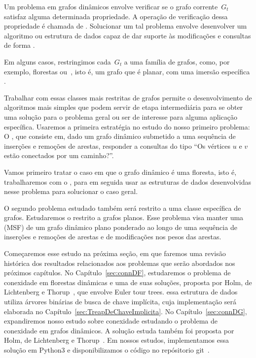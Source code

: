 Um problema em grafos dinâmicos envolve verificar se o grafo corrente~$G_t$ satisfaz alguma determinada propriedade.
A operação de verificação dessa propriedade é chamada de .
Solucionar um tal problema envolve desenvolver um algoritmo ou estrutura de dados capaz de dar suporte às modificações e consultas de forma .

Em alguns casos, restringimos cada~$G_t$ a uma família de grafos, como, por exemplo, florestas ou~, isto é, um grafo que é planar, com uma imersão específica .

Trabalhar com essas classes mais restritas de grafos permite o desenvolvimento de algoritmos mais simples que podem servir de etapa intermediária para se obter uma solução para o problema geral ou ser de interesse para alguma aplicação específica.
Usaremos a primeira estratégia no estudo do nosso primeiro problema:
O , que consiste em, dado um grafo dinâmico submetido a uma sequência de inserções e remoções de arestas, responder a consultas do tipo “Os vértices $u$ e $v$ estão conectados por um caminho?”.

Vamos primeiro tratar o caso em que o grafo dinâmico é uma floresta, isto é, trabalharemos com o ,
para em seguida usar as estruturas de dados desenvolvidas nesse problema para solucionar o caso geral.

O segundo problema estudado também será restrito a uma classe específica de grafos.
Estudaremos o  restrito a grafos planos.
Esse problema visa manter uma  (MSF) de um grafo dinâmico plano ponderado ao longo de uma sequência de inserções e remoções de arestas e de modificações nos pesos das arestas.

Começaremos esse estudo na próxima seção, em que faremos uma revisão histórica dos resultados relacionados aos problemas que serão abordados nos próximos capítulos.
No Capítulo~\ref{sec:connDF}, estudaremos o problema de conexidade em florestas dinâmicas e uma de suas soluções, proposta por Holm, de Lichtenberg e Thorup~\cite{poly_log}, que envolve Euler tour trees.
 essa estrutura de dados utiliza  árvores binárias de busca de chave implícita, cuja implementação será elaborada no Capítulo~\ref{sec:TreapDeChaveImplicita}.
No Capítulo~\ref{sec:connDG}, expandiremos nosso estudo sobre conexidade estudando o problema de conexidade em grafos dinâmicos.
A solução estuda também foi proposta por Holm, de Lichtenberg e Thorup~\cite{poly_log}.
Em nossos estudos, implementamos essa solução em Python3 e disponibilizamos o código no repósitorio git~\cite{github}.


